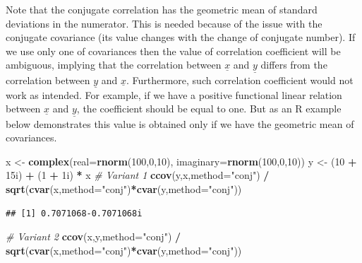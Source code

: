 \documentclass[
]{book}
\newenvironment{Shaded}{\begin{snugshade}}{\end{snugshade}}
\newcommand{\CommentTok}[1]{\textcolor[rgb]{0.56,0.35,0.01}{\textit{#1}}}
\newcommand{\DataTypeTok}[1]{\textcolor[rgb]{0.13,0.29,0.53}{#1}}
\newcommand{\DecValTok}[1]{\textcolor[rgb]{0.00,0.00,0.81}{#1}}
\newcommand{\KeywordTok}[1]{\textcolor[rgb]{0.13,0.29,0.53}{\textbf{#1}}}
\newcommand{\NormalTok}[1]{#1}
\newcommand{\OperatorTok}[1]{\textcolor[rgb]{0.81,0.36,0.00}{\textbf{#1}}}
\newcommand{\StringTok}[1]{\textcolor[rgb]{0.31,0.60,0.02}{#1}}
\begin{document}
Note that the conjugate correlation has the geometric mean of standard deviations in the numerator. This is needed because of the issue with the conjugate covariance (its value changes with the change of conjugate number). If we use only one of covariances \citep[as done, for example, by][]{Panchev1971} then the value of correlation coefficient will be ambiguous, implying that the correlation between \(\underline{x}\) and \(\underline{y}\) differs from the correlation between \(\underline{y}\) and \(\underline{x}\). Furthermore, such correlation coefficient would not work as intended. For example, if we have a positive functional linear relation between \(\underline{x}\) and \(\underline{y}\), the coefficient should be equal to one. But as an R example below demonstrates this value is obtained only if we have the geometric mean of covariances.

\begin{Shaded}
\begin{Highlighting}[]
\NormalTok{x \textless{}{-}}\StringTok{ }\KeywordTok{complex}\NormalTok{(}\DataTypeTok{real=}\KeywordTok{rnorm}\NormalTok{(}\DecValTok{100}\NormalTok{,}\DecValTok{0}\NormalTok{,}\DecValTok{10}\NormalTok{), }\DataTypeTok{imaginary=}\KeywordTok{rnorm}\NormalTok{(}\DecValTok{100}\NormalTok{,}\DecValTok{0}\NormalTok{,}\DecValTok{10}\NormalTok{))}
\NormalTok{y \textless{}{-}}\StringTok{ }\NormalTok{(}\DecValTok{10} \OperatorTok{+}\StringTok{ }\NormalTok{15i) }\OperatorTok{+}\StringTok{ }\NormalTok{(}\DecValTok{1} \OperatorTok{+}\StringTok{ }\NormalTok{1i) }\OperatorTok{*}\StringTok{ }\NormalTok{x}
\CommentTok{\# Variant 1}
\KeywordTok{ccov}\NormalTok{(y,x,}\DataTypeTok{method=}\StringTok{"conj"}\NormalTok{) }\OperatorTok{/}
\StringTok{    }\KeywordTok{sqrt}\NormalTok{(}\KeywordTok{cvar}\NormalTok{(x,}\DataTypeTok{method=}\StringTok{"conj"}\NormalTok{)}\OperatorTok{*}\KeywordTok{cvar}\NormalTok{(y,}\DataTypeTok{method=}\StringTok{"conj"}\NormalTok{))}
\end{Highlighting}
\end{Shaded}

\begin{verbatim}
## [1] 0.7071068-0.7071068i
\end{verbatim}

\begin{Shaded}
\begin{Highlighting}[]
\CommentTok{\# Variant 2}
\KeywordTok{ccov}\NormalTok{(x,y,}\DataTypeTok{method=}\StringTok{"conj"}\NormalTok{) }\OperatorTok{/}
\StringTok{    }\KeywordTok{sqrt}\NormalTok{(}\KeywordTok{cvar}\NormalTok{(x,}\DataTypeTok{method=}\StringTok{"conj"}\NormalTok{)}\OperatorTok{*}\KeywordTok{cvar}\NormalTok{(y,}\DataTypeTok{method=}\StringTok{"conj"}\NormalTok{))}
\end{Highlighting}
\end{Shaded}
\end{document}
